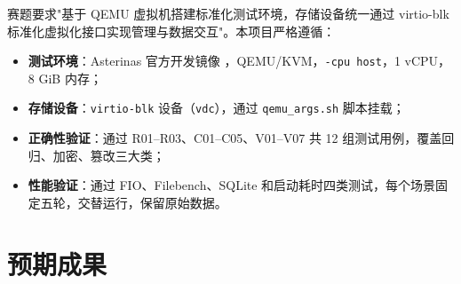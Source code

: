 赛题要求"基于 QEMU 虚拟机搭建标准化测试环境，存储设备统一通过 virtio-blk 标准化虚拟化接口实现管理与数据交互"。本项目严格遵循：

\begin{itemize}
    \item \textbf{测试环境}：Asterinas 官方开发镜像 \texttt{}，QEMU/KVM，\texttt{-cpu host}，1 vCPU，8 GiB 内存；
    \item \textbf{存储设备}：\texttt{virtio-blk} 设备（\texttt{vdc}），通过 \texttt{qemu\_args.sh} 脚本挂载；
    \item \textbf{正确性验证}：通过 R01–R03、C01–C05、V01–V07 共 12 组测试用例，覆盖回归、加密、篡改三大类；
    \item \textbf{性能验证}：通过 FIO、Filebench、SQLite 和启动耗时四类测试，每个场景固定五轮，交替运行，保留原始数据。
\end{itemize}

\section{预期成果}

